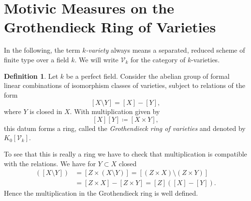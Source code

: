 \documentclass[11pt, a4paper, english, twoside]{article}
\theoremstyle{plain}
\theoremstyle{definition}
\newtheorem{definition}[theorem]{Definition}
\newcommand{\gring}[1][k]{K_0[\mathcal{V}_#1]}
\DeclareMathOperator{\Sym}{Sym}
\begin{document}
%
%


\section{Motivic Measures on the Grothendieck Ring of Varieties}
\label{sec1}
In the following, the term \emph{$k$-variety} always means a separated, reduced scheme of finite type over a field $k$.
We will write $\mathcal{V}_k$ for the category of $k$-varieties. 

\begin{definition}
    \label{gringdef}
    Let $k$ be a perfect field. 
    Consider the abelian group of formal linear combinations of isomorphism classes of varieties, subject to relations of the form
    \[
        [X \setminus Y] = [X] - [Y],
    \] where $Y$ is closed in $X$.
    With multiplication given by
    \[
        [X][Y] \coloneqq [X \times Y],
    \]
    this datum forms a ring, called the \emph{Grothendieck ring of varieties} and denoted by $\gring$. 
    
    \end{definition}

To see that this is really a ring we have to check that multiplication is compatible with the relations. We have for $Y \subset X$ closed
\begin{align*}
    [Z] ([X \setminus Y])   &= [Z \times (X \setminus Y)] = [(Z \times X) \setminus (Z \times Y)] \\
                            &= [Z \times X] - [Z \times Y] = [Z]([X] - [Y]).
\end{align*}
Hence the multiplication in the Grothendieck ring is well defined.
\end{document}

